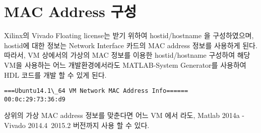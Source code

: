 \documentclass[11pt
  , a4paper
  , article
  , oneside
]{memoir}
\begin{document}
\chapter{MAC Address 구성}
Xilinx의 Vivado Floating license는 받기 위하여 hostid/hostname 을 구성하였으며, hostid에 대한 정보는 Network Interface 카드의 MAC address 정보를 사용하게 된다. 따라서, VM 상에서의 가상의 MAC 정보를 이용한 hostid/hostname 구성하여 해당 VM을 사용하는 어느 개발환경에서라도 MATLAB-System Generator를 사용하여 HDL 코드를 개발 할 수 있게 된다.

\begin{lstlisting}[style=termstyle, escapechar=!]
===Ubuntu14.1\_64 VM Network MAC Address Info======
00:0c:29:73:36:d9
\end{lstlisting}

상위의 가상 MAC address 정보를 맞춘다면 어느 VM 에서 라도, Matlab 2014a - Vivado 2014.4~2015.2 버전까지 사용 할 수 있다.


\clearpage


\end{document}
